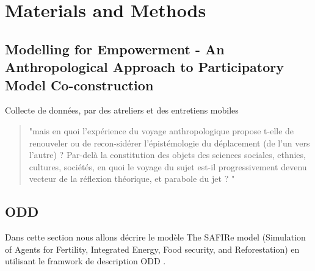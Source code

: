 \documentclass{article}
\begin{document}



\section{Materials and Methods}

\subsection{Modelling for Empowerment - An Anthropological Approach to Participatory Model Co-construction}
Collecte de données, par des atreliers et des entretiens mobiles

\begin{quote}
"mais en quoi l’expérience du voyage anthropologique propose t-elle de renouveler ou de recon-sidérer l’épistémologie du déplacement (de l’un vers l’autre) ? Par-delà la constitution des objets des sciences sociales, ethnies, cultures, sociétés, en quoi le voyage du sujet est-il progressivement devenu vecteur de la réflexion théorique, et parabole du jet ? "
\end{quote}

\subsection{ODD }

    Dans cette section nous allons décrire le modèle The SAFIRe model (Simulation of Agents for Fertility, Integrated Energy, Food security, and Reforestation) en utilisant le framwork de description ODD \cite{grimm_standard_2006,grimm_odd_2010,grimm_odd_2020}.
\end{document}
